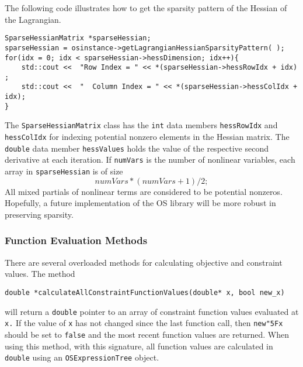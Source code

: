 \documentclass[11pt]{article}
\renewcommand{\_}{{\char"5F}}
\renewcommand{\{}{{\char"7B}}
\renewcommand{\}}{{\char"7D}}
\renewcommand{\^}{{\char"0D}}
\renewcommand{\'}{{\char"0D}}
\begin{document}
The following code illustrates how to get the sparsity pattern of the Hessian of the Lagrangian.
\begin{verbatim}
SparseHessianMatrix *sparseHessian;
sparseHessian = osinstance->getLagrangianHessianSparsityPattern( );
for(idx = 0; idx < sparseHessian->hessDimension; idx++){
	std::cout <<  "Row Index = " << *(sparseHessian->hessRowIdx + idx) ;
	std::cout <<  "  Column Index = " << *(sparseHessian->hessColIdx + idx);
}
\end{verbatim}
The {\tt SparseHessianMatrix} class has the {\tt int} data members {\tt hessRowIdx} and {\tt hessColIdx} for indexing  potential nonzero elements in the Hessian matrix. The {\tt double} data member {\tt hessValues} holds the value of the respective second derivative at each iteration.  If {\tt numVars} is the number of nonlinear variables, each array in {\tt sparseHessian} is of size
$$
numVars*(numVars + 1)/2;
$$
All mixed partials of nonlinear terms are considered to be potential nonzeros.  Hopefully, a future implementation of the OS library will be more robust in preserving sparsity.


\subsubsection{Function Evaluation Methods}

There are several overloaded methods for calculating objective and constraint values.  The method
\begin{verbatim}
double *calculateAllConstraintFunctionValues(double* x, bool new_x)
\end{verbatim}
will return a {\tt double} pointer to an array of constraint function values evaluated at {\tt x.}  If the value of {\tt x} has not changed since the last function call, then {\tt new\_x} should be set to {\tt false} and the most recent function values are returned.  When using this method, with this signature,  all function values are calculated in {\tt double} using an {\tt OSExpressionTree} object.
\end{document}
